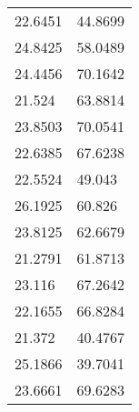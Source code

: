 \documentclass[bwprint]{gmcmthesis}
\begin{document}
\begin{longtable}{ll}
22.6451           & 44.8699            \\
24.8425           & 58.0489            \\
24.4456           & 70.1642            \\
21.524            & 63.8814            \\
23.8503           & 70.0541            \\
22.6385           & 67.6238            \\
22.5524           & 49.043             \\
26.1925           & 60.826             \\
23.8125           & 62.6679            \\
21.2791           & 61.8713            \\
23.116            & 67.2642            \\
22.1655           & 66.8284            \\
21.372            & 40.4767            \\ 
25.1866           & 39.7041            \\
23.6661           & 69.6283            \\ 
\end{longtable}
\end{document}
